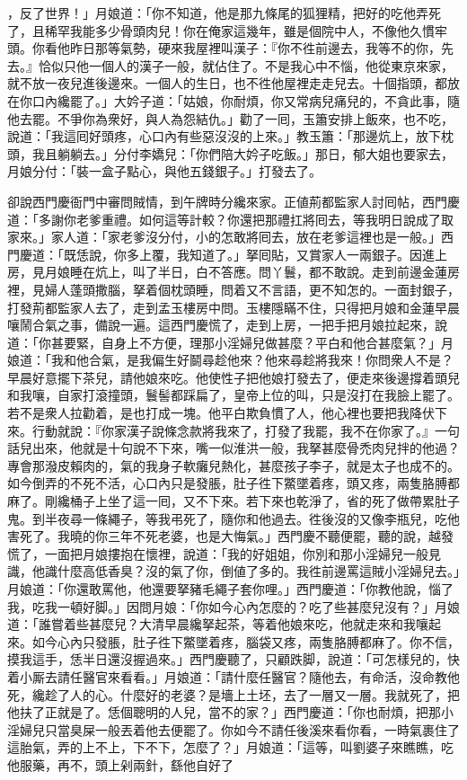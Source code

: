 ，反了世界！」月娘道：「你不知道，他是那九條尾的狐狸精，把好的吃他弄死了，且稀罕我能多少骨頭肉兒！你在俺家這幾年，雖是個院中人，不像他久慣牢頭。你看他昨日那等氣勢，硬來我屋裡叫漢子：『你不徃前邊去，我等不的你，先去。』恰似只他一個人的漢子一般，就佔住了。不是我心中不惱，他從東京來家，就不放一夜兒進後邊來。一個人的生日，也不徃他屋裡走走兒去。十個指頭，都放在你口內纔罷了。」{}大妗子道：「姑娘，你耐煩，你又常病兒痛兒的，不貪此事，隨他去罷。不爭你為衆好，與人為怨結仇。」勸了一囘，玉簫安排上飯來，也不吃，說道：「我這囘好頭疼，心口內有些惡沒沒的上來。」教玉簫：「那邊炕上，放下枕頭，我且躺躺去。」分付李嬌兒：「你們陪大妗子吃飯。」那日，郁大姐也要家去，月娘分付：「裝一盒子點心，與他五錢銀子。」打發去了。

卻說西門慶衙門中審問賊情，到午牌時分纔來家。正値荊都監家人討囘帖，西門慶道：「多謝你老爹重禮。如何這等計較？你還把那禮扛將囘去，等我明日說成了取家來。」家人道：「家老爹沒分付，小的怎敢將囘去，放在老爹這裡也是一般。」西門慶道：「既恁說，你多上覆，我知道了。」拏囘貼，又賞家人一兩銀子。因進上房，見月娘睡在炕上，叫了半日，白不答應。問丫鬟，都不敢說。走到前邊金蓮房裡，見婦人蓬頭撒腦，拏着個枕頭睡，問着又不言語，更不知怎的。一面封銀子，打發荊都監家人去了，走到孟玉樓房中問。玉樓隱瞞不住，只得把月娘和金蓮早晨嚷鬧合氣之事，備說一遍。這西門慶慌了，走到上房，一把手把月娘拉起來，說道：「你甚要緊，自身上不方便，理那小淫婦兒做甚麼？平白和他合甚麼氣？」月娘道：「我和他合氣，是我偏生好鬬尋趁他來？他來尋趁將我來！你問衆人不是？早晨好意擺下茶兒，請他娘來吃。他使性子把他娘打發去了，便走來後邊撐着頭兒和我嚷，自家打滾撞頭，鬟髻都踩扁了，皇帝上位的叫，只是沒打在我臉上罷了。若不是衆人拉勸着，是也打成一塊。他平白欺負慣了人，他心裡也要把我降伏下來。行動就說：『你家漢子說條念款將我來了，打發了我罷，我不在你家了。』一句話兒出來，他就是十句說不下來，嘴一似淮洪一般，我拏甚麼骨禿肉兒拌的他過？專會那潑皮賴肉的，氣的我身子軟癱兒熱化，甚麼孩子李子，就是太子也成不的。如今倒弄的不死不活，心口內只是發脹，肚子徃下鱉墜着疼，頭又疼，兩隻胳膊都麻了。剛纔桶子上坐了這一囘，又不下來。若下來也乾淨了，省的死了做帶累肚子鬼。到半夜尋一條繩子，等我弔死了，隨你和他過去。徃後沒的又像李瓶兒，吃他害死了。{}我曉的你三年不死老婆，也是大悔氣。」西門慶不聽便罷，聽的說，越發慌了，一面把月娘摟抱在懷裡，說道：「我的好姐姐，你別和那小淫婦兒一般見識，他識什麼高低香臭？沒的氣了你，倒値了多的。我徃前邊罵這賊小淫婦兒去。」月娘道：「你還敢罵他，他還要拏豬毛繩子套你哩。」西門慶道：「你教他說，惱了我，吃我一頓好脚。」因問月娘：「你如今心內怎麼的？吃了些甚麼兒沒有？」月娘道：「誰嘗着些甚麼兒？大清早晨纔拏起茶，等着他娘來吃，他就走來和我嚷起來。如今心內只發脹，肚子徃下鱉墜着疼，腦袋又疼，兩隻胳膊都麻了。你不信，摸我這手，恁半日還沒握過來。」西門慶聽了，只顧跌脚，說道：「可怎樣兒的，快着小厮去請任醫官來看看。」月娘道：「請什麼任醫官？隨他去，有命活，沒命教他死，纔趁了人的心。什麼好的老婆？是墻上土坯，去了一層又一層。我就死了，把他扶了正就是了。恁個聰明的人兒，當不的家？」西門慶道：「你也耐煩，把那小淫婦兒只當臭屎一般丟着他去便罷了。你如今不請任後溪來看你看，一時氣裹住了這胎氣，弄的上不上，下不下，怎麼了？」月娘道：「這等，叫劉婆子來瞧瞧，吃他服藥，再不，頭上剁兩針，繇他自好了